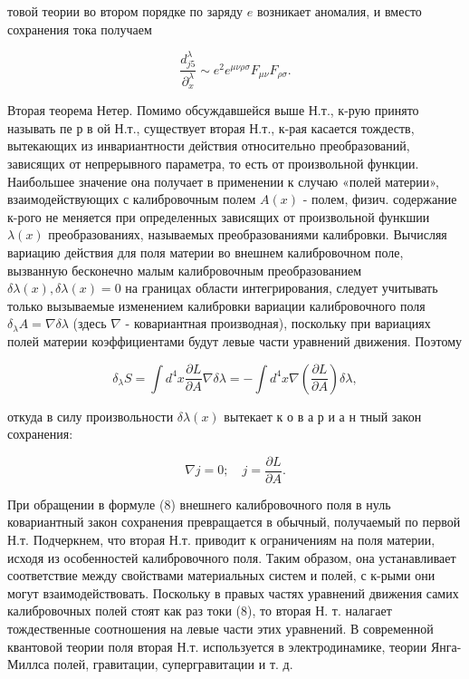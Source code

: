 \documentclass[10pt]{article}
\begin{document}
товой теории во втором порядке по заряду $e$ возникает аномалия, и вместо сохранения тока получаем



\[

\frac{d_{j 5}^{\lambda}}{\partial_{x}^{\lambda}} \sim e^{2} e^{\mu \nu \rho \sigma} F_{\mu \nu} F_{\rho \sigma} .

\]



Вторая теорема Нетер. Помимо обсуждавшейся выше Н.т., к-рую принято называть пе р в ой Н.т., существует вторая Н.т., к-рая касается тождеств, вытекающих из инвариантности действия относительно преобразований, зависящих от непрерывного параметра, то есть от произвольной функции. Наибольшее значение она получает в применении к случаю «полей материи», взаимодействующих с калибровочным полем $A(x)$ - полем, физич. содержание к-рого не меняется при определенных зависящих от произвольной функшии $\lambda(x)$ преобразованиях, называемых преобразованиями калибровки. Вычисляя вариацию действия для поля материи во внешнем калибровочном поле, вызванную бесконечно малым калибровочным преобразованием $\delta \lambda(x), \delta \lambda(x)=0$ на границах области интегрирования, следует учитывать только вызываемые изменением калибровки вариации калибровочного поля $\delta_{\lambda} A=\nabla \delta \lambda$ (здесь $\nabla$ - ковариантная производная), поскольку при вариациях полей материи коэффициентами будут левые части уравнений движения. Поэтому



\[

\delta_{\lambda} S=\int d^{4} x \frac{\partial L}{\partial A} \nabla \delta \lambda=-\int d^{4} x \nabla\left(\frac{\partial L}{\partial A}\right) \delta \lambda,

\]



откуда в силу произвольности $\delta \lambda(x)$ вытекает к о в а р и а н тный закон сохранения:



\[

\nabla j=0 ; \quad j=\frac{\partial L}{\partial A} .

\]



При обращении в формуле (8) внешнего калибровочного поля в нуль ковариантный закон сохранения превращается в обычный, получаемый по первой Н.т. Подчеркнем, что вторая Н.т. приводит к ограничениям на поля материи, исходя из особенностей калибровочного поля. Таким образом, она устанавливает соответствие между свойствами материальных систем и полей, с к-рыми они могут взаимодействовать. Поскольку в правых частях уравнений движения самих калибровочных полей стоят как раз токи (8), то вторая Н. т. налагает тождественные соотношения на левые части этих уравнений. В современной квантовой теории поля вторая Н.т. используется в электродинамике, теории Янга-Миллса полей, гравитации, супергравитации и т. д.
\end{document}
